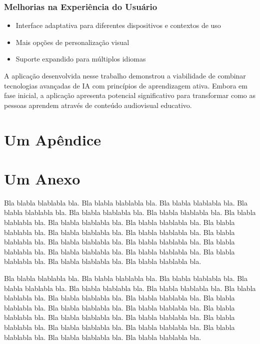 \documentclass[tcc,capa]{texufpel}
\begin{document}
\subsection{Melhorias na Experiência do Usuário}
\begin{itemize}
    \item Interface adaptativa para diferentes dispositivos e contextos de uso
    \item Mais opções de personalização visual
    \item Suporte expandido para múltiplos idiomas
\end{itemize}

A aplicação desenvolvida nesse trabalho demonstrou a viabilidade de combinar tecnologias avançadas de IA com princípios de aprendizagem ativa. Embora em fase inicial, a aplicação apresenta potencial significativo para transformar como as pessoas aprendem através de conteúdo audiovisual educativo.






 

\apendices
\chapter{Um Apêndice}

\anexos
\chapter{Um Anexo}

Bla blabla blablabla bla.  Bla blabla blablabla bla.  Bla blabla
blablabla bla.  Bla blabla blablabla bla.  Bla blabla blablabla bla.
Bla blabla blablabla bla.  Bla blabla blablabla bla.  Bla blabla
blablabla bla.  Bla blabla blablabla bla.  Bla blabla blablabla bla.
Bla blabla blablabla bla.  Bla blabla blablabla bla.  Bla blabla
blablabla bla.  Bla blabla blablabla bla.  Bla blabla blablabla bla.
Bla blabla blablabla bla.  Bla blabla blablabla bla.  Bla blabla
blablabla bla.  Bla blabla blablabla bla.  Bla blabla blablabla bla.
Bla blabla blablabla bla.

Bla blabla blablabla bla.  Bla blabla blablabla bla.  Bla blabla
blablabla bla.  Bla blabla blablabla bla.  Bla blabla blablabla bla.
Bla blabla blablabla bla.  Bla blabla blablabla bla.  Bla blabla
blablabla bla.  Bla blabla blablabla bla.  Bla blabla blablabla bla.
Bla blabla blablabla bla.  Bla blabla blablabla bla.  Bla blabla
blablabla bla.  Bla blabla blablabla bla.  Bla blabla blablabla bla.
Bla blabla blablabla bla.  Bla blabla blablabla bla.  Bla blabla
blablabla bla.  Bla blabla blablabla bla.  Bla blabla blablabla bla.
Bla blabla blablabla bla.
\end{document}
